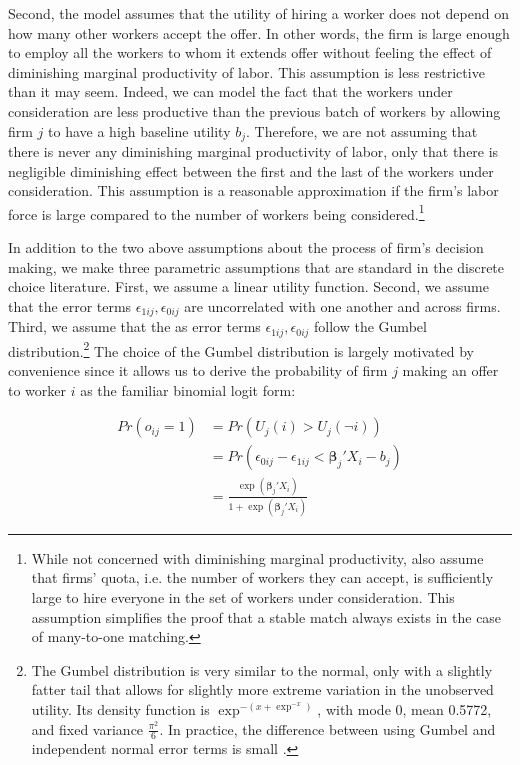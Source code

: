 Second, the model assumes that the utility of hiring a worker does not depend on
how many other workers accept the offer. In other words, the firm is large
enough to employ all the workers to whom it extends offer without feeling the
effect of diminishing marginal productivity of labor. This assumption is less
restrictive than it may seem. Indeed, we can model the fact that the workers
under consideration are less productive than the previous batch of workers by
allowing firm $j$ to have a high baseline utility $b_j$. Therefore, we are not
assuming that there is never any diminishing marginal
productivity of labor, only that there is negligible diminishing effect between
the first and the last of the workers under consideration. This assumption is a
reasonable approximation if the firm's labor force is large compared to the
number of workers being considered.\footnote{While not concerned with
  diminishing marginal productivity, \citet{Roth1992} also assume that firms'
  quota, i.e. the number of workers they can accept, is sufficiently large to
  hire everyone in the set of workers under consideration. This assumption
  simplifies the proof that a stable match always exists in the case of
  many-to-one matching.}

In addition to the two above assumptions about the process of firm's decision
making, we make three parametric assumptions that are standard in the discrete
choice literature. First, we assume a linear utility function. Second, we assume
that the error terms $\epsilon_{1ij}, \epsilon_{0ij}$ are uncorrelated with one
another and across firms. Third, we assume that the as error terms
$\epsilon_{1ij}, \epsilon_{0ij}$ follow the Gumbel distribution.\footnote{The
  Gumbel distribution is very similar to the normal, only with a slightly fatter
  tail that allows for slightly more extreme variation in the unobserved
  utility. Its density function is $\exp^{-(x + \exp^{-x})}$, with mode 0, mean
  0.5772, and fixed variance $\frac{\pi^2}{6}$. In practice, the difference
  between using Gumbel and independent normal error terms is small
  \citep{Train2009}.} The choice of the Gumbel distribution is largely motivated
by convenience since it allows us to derive the probability of firm $j$ making
an offer to worker $i$ as the familiar binomial logit form:

\begin{align}
  Pr(o_{ij} = 1) &= Pr(U_j(i) > U_j(\neg i)) \\
                 &= Pr(\epsilon_{0ij} - \epsilon_{1ij} <  \bm{\beta}_j ' X_i - b_j) \\
                 &= \frac{\exp({\bm{\beta}_j'X_i})}{1 + \exp({\bm{\beta}_j'X_i})} \label{eq:prob_offer_ij}
\end{align}

